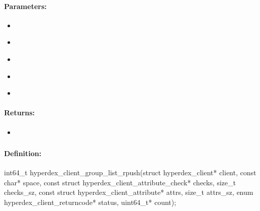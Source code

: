 \paragraph{Parameters:}
\begin{itemize}[noitemsep]
\item {}\\

\item {}\\

\item {}\\

\item {}\\

\item {}\\

\end{itemize}

\paragraph{Returns:}
\begin{itemize}[noitemsep]
\item {}\\

\end{itemize}

\pagebreak
\subsubsection{}
\label{api:c:group_list_rpush}


\paragraph{Definition:}
\begin{ccode}
int64_t hyperdex_client_group_list_rpush(struct hyperdex_client* client,
        const char* space,
        const struct hyperdex_client_attribute_check* checks, size_t checks_sz,
        const struct hyperdex_client_attribute* attrs, size_t attrs_sz,
        enum hyperdex_client_returncode* status,
        uint64_t* count);
\end{ccode}

